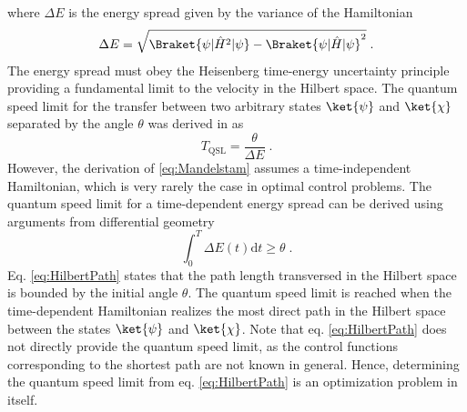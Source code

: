 where $\Delta E$ is the energy spread given by the variance of the Hamiltonian
\begin{equation}
	\Delta E  =  \sqrt{\Braket{\psi | \hat{H}^ 2 | \psi} - \Braket{\psi | \hat{H} | \psi} ^ 2 } \; .
\end{equation}
The energy spread must obey the Heisenberg time-energy uncertainty principle providing a fundamental limit to the velocity in the Hilbert space. The quantum speed limit for the transfer between two arbitrary states $\ket{\psi}$ and $\ket{\chi}$ separated by the angle $\theta$ was derived in \cite{Mandelstam1991} as
\begin{equation}
	T_{\mathrm{QSL}} = \frac{\theta}{\Delta E} \; . \label{eq:Mandelstam}
\end{equation}
However, the derivation of \eqref{eq:Mandelstam} assumes a time-independent Hamiltonian, which is very rarely the case in optimal control problems. The quantum speed limit for a time-dependent energy spread can be derived using arguments from differential geometry \cite{Aharonov,beyondQSL}
\begin{equation}
	\int_{0}^{T} \Delta E(t) \mathrm{d}t \geq \theta \; . \label{eq:HilbertPath}
\end{equation}
Eq. \eqref{eq:HilbertPath} states that the path length transversed in the Hilbert space is bounded by the initial angle $\theta$. The quantum speed limit is reached when the time-dependent Hamiltonian realizes the most direct path in the Hilbert space between the states $\ket{\psi}$ and $\ket{\chi}$. Note that eq. \eqref{eq:HilbertPath} does not directly provide the quantum speed limit, as the control functions corresponding to the shortest path are not known in general. Hence, determining the quantum speed limit from eq. \eqref{eq:HilbertPath} is an optimization problem in itself.\\

